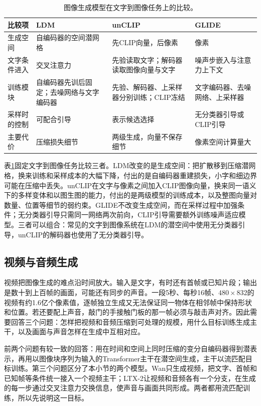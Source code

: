 \begin{table}[htbp]
  \centering
  \small
  \begin{tabularx}{\linewidth}{@{}p{18mm}XXX@{}}
    \toprule
    比较项 & LDM & unCLIP & GLIDE\\
    \midrule
    生成空间 & 自编码器的空间潜网格 & 先CLIP向量，后像素 & 像素\\
    文字条件进入 & 交叉注意力 & 先验读取文字；解码器读取图像向量与文字 & 噪声步嵌入与注意力上下文\\
    训练模块 & 自编码器先训后固定；去噪网络与文字编码器 & 先验、解码器、上采样器分别训练；CLIP冻结 & 文字编码器、去噪网络、上采样器\\
    采样时的控制 & 可配合引导 & 表示候选选择 & 无分类器引导或CLIP引导\\
    主要代价 & 压缩损失细节 & 两级生成，向量不保存细节 & 像素空间计算量大\\
    \bottomrule
  \end{tabularx}
  \caption{图像生成模型在文字到图像任务上的比较。}
  \label{tab:vision-models-image-compare}
\end{table}

表\ref{tab:vision-models-image-compare}固定文字到图像任务比较三者。LDM改变的是生成空间：把扩散移到压缩潜网格，换来训练和采样成本的大幅下降，付出的是自编码器重建损失，小字和细边界可能在压缩中丢失。unCLIP在文字与像素之间加入CLIP图像向量，换来同一语义下的多样变体和以图生图的能力，付出的是两级模型的训练成本，以及整图向量对数量、位置等细节的弱约束。GLIDE不改变生成空间，而在采样过程中加强条件；无分类器引导只需同一网络两次前向，CLIP引导需要额外训练噪声适应模型。三者可以组合：常见的文字到图像系统在LDM的潜空间中使用无分类器引导，unCLIP的解码器也使用了无分类器引导。

\subsection{视频与音频生成}
\label{sec:vision-models-flow-matching}
\label{sec:vision-models-video-audio-generation}

视频把图像生成的难点沿时间放大。输入是文字，有时还有首帧或已知片段；输出是数十到上百帧的画面，可能还有同步的声音。一段5秒、每秒16帧、$480\times832$的视频有约1.6亿个像素值，逐帧独立生成又无法保证同一物体在相邻帧中保持形状和位置。若还要配上声音，敲门的手接触门板的那一帧必须与敲击声对齐。因此需要回答三个问题：怎样把视频和音频压缩到可处理的规模，用什么目标训练生成主干，以及画面与声音怎样在生成中互相对应。

前两个问题有较一致的回答：用在时间和空间上同时压缩的变分自编码器得到潜表示，再用以图像块序列为输入的Transformer主干在潜空间生成，主干以流匹配目标训练。第三个问题区分了本小节的两个模型。Wan只生成视频，把文字、首帧和已知帧等条件统一接入一个视频主干；LTX-2让视频和音频各有一个分支，在生成的每一步通过交叉注意力交换信息，使声音与画面共同形成。两者都用流匹配训练，所以先说明这一目标。

